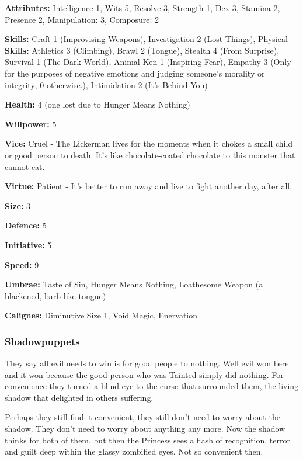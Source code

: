 \noindent \textbf{Attributes:} Intelligence 1, Wits 5, Resolve 3, Strength 1, Dex 3, Stamina 2, Presence 2, Manipulation: 3, Composure: 2

\noindent \textbf{Skills:} Craft 1 (Improvising Weapons), Investigation 2 (Lost Things), Physical \noindent \textbf{Skills:} Athletics 3 (Climbing), Brawl 2 (Tongue), Stealth 4 (From Surprise), Survival 1 (The Dark World), Animal Ken 1 (Inspiring Fear), Empathy 3 (Only for the purposes of negative emotions and judging someone's morality or integrity; 0 otherwise.), Intimidation 2 (It's Behind You)

\noindent \textbf{Health:} 4 (one lost due to Hunger Means Nothing)

\noindent \textbf{Willpower:} 5

\noindent \textbf{Vice:} Cruel - The Lickerman lives for the moments when it chokes a small child or good person to death. It's like chocolate-coated chocolate to this monster that cannot eat.

\noindent \textbf{Virtue:} Patient - It's better to run away and live to fight another day, after all.

\noindent \textbf{Size:} 3

\noindent \textbf{Defence:} 5

\noindent \textbf{Initiative:} 5

\noindent \textbf{Speed:} 9

\noindent \textbf{Umbrae:} Taste of Sin, Hunger Means Nothing, Loathesome Weapon (a blackened, barb-like tongue)

\noindent \textbf{Calignes:} Diminutive Size 1, Void Magic, Enervation

\subsubsection*{Shadowpuppets}

They say all evil needs to win is for good people to nothing. Well evil won here and it won because the good person who was Tainted simply did nothing. For convenience they turned a blind eye to the curse that surrounded them, the living shadow that delighted in others suffering.

Perhaps they still find it convenient, they still don't need to worry about the shadow. They don't need to worry about anything any more. Now the shadow thinks for both of them, but then the Princess sees a flash of recognition, terror and guilt deep within the glassy zombified eyes. Not so convenient then.\\

